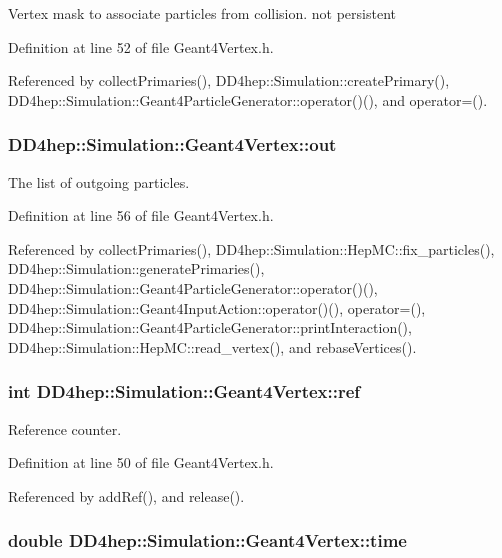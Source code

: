 Vertex mask to associate particles from collision. not persistent 

Definition at line 52 of file Geant4Vertex.h.

Referenced by collectPrimaries(), DD4hep::Simulation::createPrimary(), DD4hep::Simulation::Geant4ParticleGenerator::operator()(), and operator=().\hypertarget{class_d_d4hep_1_1_simulation_1_1_geant4_vertex_a238ee91ad7a5d6230d58335af4af6d70}{
\subsubsection[{out}]{ {\bf DD4hep::Simulation::Geant4Vertex::out}}}
\label{class_d_d4hep_1_1_simulation_1_1_geant4_vertex_a238ee91ad7a5d6230d58335af4af6d70}


The list of outgoing particles. 

Definition at line 56 of file Geant4Vertex.h.

Referenced by collectPrimaries(), DD4hep::Simulation::HepMC::fix\_\-particles(), DD4hep::Simulation::generatePrimaries(), DD4hep::Simulation::Geant4ParticleGenerator::operator()(), DD4hep::Simulation::Geant4InputAction::operator()(), operator=(), DD4hep::Simulation::Geant4ParticleGenerator::printInteraction(), DD4hep::Simulation::HepMC::read\_\-vertex(), and rebaseVertices().\hypertarget{class_d_d4hep_1_1_simulation_1_1_geant4_vertex_a27572aae6fd5018503860b323bc9d34e}{
\subsubsection[{ref}]{\setlength{\rightskip}{0pt plus 5cm}int {\bf DD4hep::Simulation::Geant4Vertex::ref}}}
\label{class_d_d4hep_1_1_simulation_1_1_geant4_vertex_a27572aae6fd5018503860b323bc9d34e}


Reference counter. 

Definition at line 50 of file Geant4Vertex.h.

Referenced by addRef(), and release().\hypertarget{class_d_d4hep_1_1_simulation_1_1_geant4_vertex_a3c68aa0fed7db61bf66bfcfb03ad5ca0}{
\subsubsection[{time}]{\setlength{\rightskip}{0pt plus 5cm}double {\bf DD4hep::Simulation::Geant4Vertex::time}}}
\label{class_d_d4hep_1_1_simulation_1_1_geant4_vertex_a3c68aa0fed7db61bf66bfcfb03ad5ca0}


